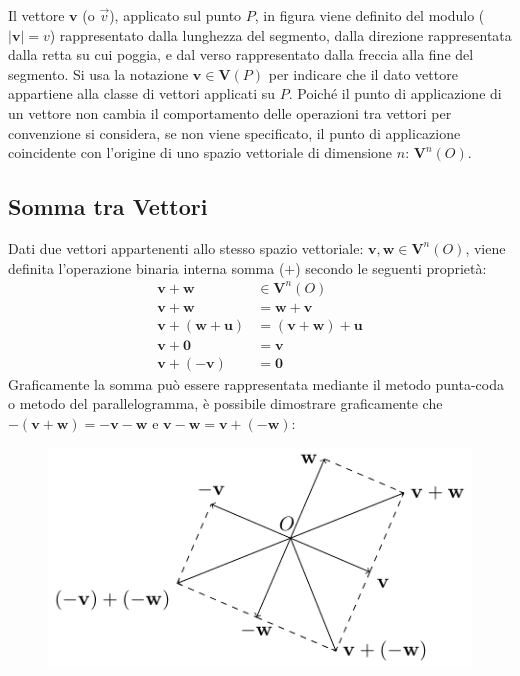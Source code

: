 \documentclass{article}
\newcommand{\vect}[1]{\boldsymbol{\mathbf{#1}}}
\numberwithin{equation}{subsection}
\begin{document}
Il vettore $\vect{v}$ (o $\vec{v}$), applicato sul punto $P$, in figura viene definito del modulo ($|\vect{v}| = v$) rappresentato dalla lunghezza del segmento, dalla direzione rappresentata dalla retta su cui poggia, e dal verso rappresentato dalla freccia alla fine del segmento.
Si usa la notazione $\vect{v}\in\vect{V}{\left(P\right)}$ per indicare che  il dato vettore appartiene alla classe di vettori applicati su $P$. Poiché il punto di applicazione di un vettore non cambia il comportamento delle operazioni tra vettori per convenzione si considera, se non viene specificato, il punto di applicazione coincidente con l'origine di uno spazio vettoriale di dimensione $n$: $\vect{V}^{n}\left(O\right)$.
\subsection{Somma tra Vettori}
Dati due vettori appartenenti allo stesso spazio vettoriale: $\vect{v}, \vect{w} \in \vect{V}^{n}\left(O\right)$, viene definita l'operazione binaria interna somma ($+$) secondo le seguenti proprietà:
\begin{align*}
    \vect{v} + \vect{w} &\in \vect{V}^{n}\left(O\right)\\
    \vect{v} + \vect{w} &= \vect{w} + \vect{v}\\
    \vect{v} + \left(\vect{w} + \vect{u}\right) &= \left(\vect{v} + \vect{w}\right) + \vect{u}\\
    \vect{v} + \vect{0} &= \vect{v}\\ 
    \vect{v} + (-\vect{v}) &= \vect{0}
\end{align*}
Graficamente la somma può essere rappresentata mediante il 
metodo punta-coda o metodo del parallelogramma, è
possibile dimostrare graficamente che 
$-\left(\vect{v} + \vect{w}\right) = -\vect{v} -\vect{w}$ e
$ \vect{v} - \vect{w} = \vect{v} + \left(-\vect{w}\right)$:

\begin{figure}[H]%
    \centering
    \includegraphics{somma-vettori.pdf}%
\end{figure}
\end{document}
